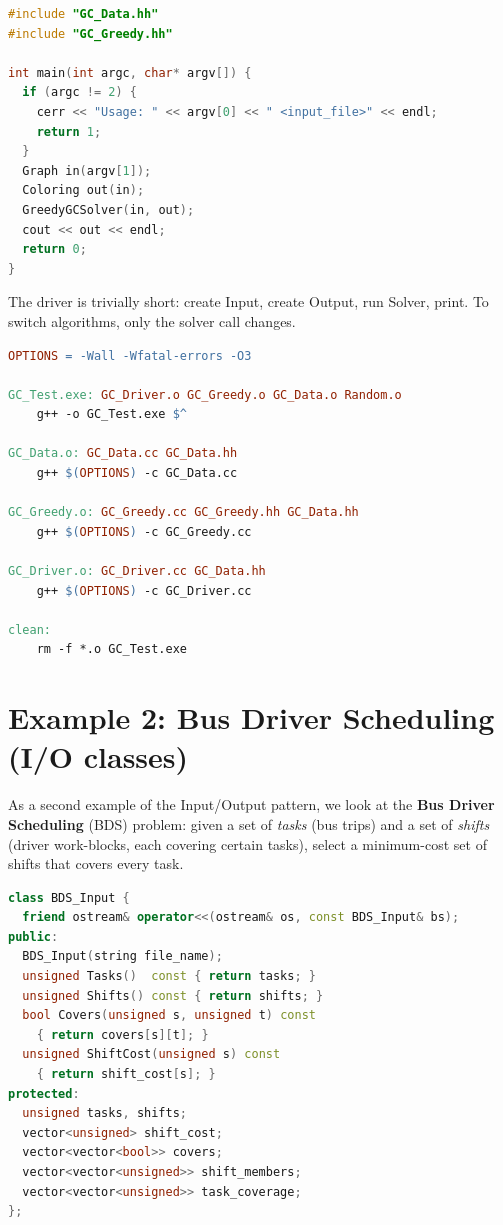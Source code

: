 \begin{lstlisting}[language=C++,
  caption={Minimal driver (\texttt{GC\_Driver.cc}).},
  label={lst:gc-driver}]
#include "GC_Data.hh"
#include "GC_Greedy.hh"

int main(int argc, char* argv[]) {
  if (argc != 2) {
    cerr << "Usage: " << argv[0] << " <input_file>" << endl;
    return 1;
  }
  Graph in(argv[1]);
  Coloring out(in);
  GreedyGCSolver(in, out);
  cout << out << endl;
  return 0;
}
\end{lstlisting}

\noindent
The driver is trivially short: create Input, create Output, run
Solver, print.  To switch algorithms, only the solver call
changes.

\begin{lstlisting}[language=make,
  caption={Makefile for the graph colouring solver.},
  label={lst:gc-makefile}]
OPTIONS = -Wall -Wfatal-errors -O3

GC_Test.exe: GC_Driver.o GC_Greedy.o GC_Data.o Random.o
    g++ -o GC_Test.exe $^

GC_Data.o: GC_Data.cc GC_Data.hh
    g++ $(OPTIONS) -c GC_Data.cc

GC_Greedy.o: GC_Greedy.cc GC_Greedy.hh GC_Data.hh
    g++ $(OPTIONS) -c GC_Greedy.cc

GC_Driver.o: GC_Driver.cc GC_Data.hh
    g++ $(OPTIONS) -c GC_Driver.cc

clean:
    rm -f *.o GC_Test.exe
\end{lstlisting}


\section{Example 2: Bus Driver Scheduling (I/O classes)}
\label{sec:bds-data}

As a second example of the Input/Output pattern, we look at the
\textbf{Bus Driver Scheduling} (BDS) problem: given a set of
\emph{tasks} (bus trips) and a set of \emph{shifts} (driver
work-blocks, each covering certain tasks), select a minimum-cost
set of shifts that covers every task.%

\begin{lstlisting}[language=C++,
  caption={\texttt{BDS\_Data.hh} --- Input class (excerpt).},
  label={lst:bds-input}]
class BDS_Input {
  friend ostream& operator<<(ostream& os, const BDS_Input& bs);
public:
  BDS_Input(string file_name);
  unsigned Tasks()  const { return tasks; }
  unsigned Shifts() const { return shifts; }
  bool Covers(unsigned s, unsigned t) const
    { return covers[s][t]; }
  unsigned ShiftCost(unsigned s) const
    { return shift_cost[s]; }
protected:
  unsigned tasks, shifts;
  vector<unsigned> shift_cost;
  vector<vector<bool>> covers;
  vector<vector<unsigned>> shift_members;
  vector<vector<unsigned>> task_coverage;
};
\end{lstlisting}

